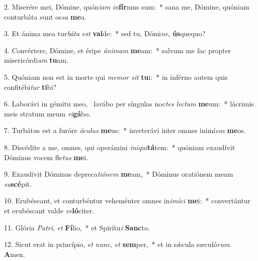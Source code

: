 2. Miserére mei, Dómine, quón\textit{i}\textit{am} \textit{in}\textbf{fír}mus sum:~*  sana me, Dómine, quóniam conturbáta sunt os\textit{sa} \textbf{me}a.\

3. Et ánima mea tur\textit{bá}\textit{ta} \textit{est} \textbf{val}de:~*  sed tu, Dómi\textit{ne}, \textbf{ús}quequo?\

4. Convértere, Dómine, et éripe \textit{á}\textit{ni}\textit{mam} \textbf{me}am:~*  salvum me fac propter misericórdi\textit{am} \textbf{tu}am.\

5. Quóniam non est in morte qui \textit{me}\textit{mor} \textit{sit} \textbf{tu}i:~*  in inférno autem quis confitébi\textit{tur} \textbf{ti}bi?\

6. Laborávi in gémitu meo, \dag\  lavábo per síngulas noc\textit{tes} \textit{lec}\textit{tum} \textbf{me}um:~*  lácrimis meis stratum meum \textit{ri}\textbf{gá}bo.\

7. Turbátus est a furóre \textit{ó}\textit{cu}\textit{lus} \textbf{me}us:~*  inveterávi inter omnes inimí\textit{cos} \textbf{me}os.\

8. Discédite a me, omnes, qui operámini \textit{in}\textit{i}\textit{qui}\textbf{tá}tem:~*  quóniam exaudívit Dóminus vocem fle\textit{tus} \textbf{me}i.\

9. Exaudívit Dóminus depreca\textit{ti}\textit{ó}\textit{nem} \textbf{me}am,~*  Dóminus oratiónem meam \textit{su}\textbf{scé}pit.\

10. Erubéscant, et conturbéntur veheménter omnes in\textit{i}\textit{mí}\textit{ci} \textbf{me}i:~*  convertántur et erubéscant valde \textit{ve}\textbf{ló}citer.\

11. Glória \textit{Pa}\textit{tri}, \textit{et} \textbf{Fí}lio,~*  et Spirítu\textit{i} \textbf{Sanc}to.\

12. Sicut erat in princípio, \textit{et} \textit{nunc}, \textit{et} \textbf{sem}per,~*  et in sǽcula sæculó\textit{rum}. \textbf{A}men.\

